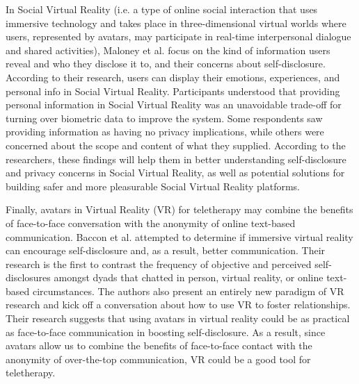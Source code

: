 In Social Virtual Reality (i.e. a type of online social interaction that uses immersive technology and takes place in three-dimensional virtual worlds where users, represented by avatars, may participate in real-time interpersonal dialogue and shared activities), Maloney et al. \cite{MAL20} focus on the kind of information users reveal and who they disclose it to, and their concerns about self-disclosure. According to their research, users can display their emotions, experiences, and personal info in Social Virtual Reality. Participants understood that providing personal information in Social Virtual Reality was an unavoidable trade-off for turning over biometric data to improve the system. Some respondents saw providing information as having no privacy implications, while others were concerned about the scope and content of what they supplied. According to the researchers, these findings will help them in better understanding self-disclosure and privacy concerns in Social Virtual Reality, as well as potential solutions for building safer and more pleasurable Social Virtual Reality platforms.

Finally, avatars in Virtual Reality (VR) for teletherapy may combine the benefits of face-to-face conversation with the anonymity of online text-based communication. Baccon et al. \cite{BAC19} attempted to determine if immersive virtual reality can encourage self-disclosure and, as a result, better communication. Their research is the first to contrast the frequency of objective and perceived self-disclosures amongst dyads that chatted in person, virtual reality, or online text-based circumstances. The authors also present an entirely new paradigm of VR research and kick off a conversation about how to use VR to foster relationships. Their research suggests that using avatars in virtual reality could be as practical as face-to-face communication in boosting self-disclosure. As a result, since avatars allow us to combine the benefits of face-to-face contact with the anonymity of over-the-top communication, VR could be a good tool for teletherapy.

